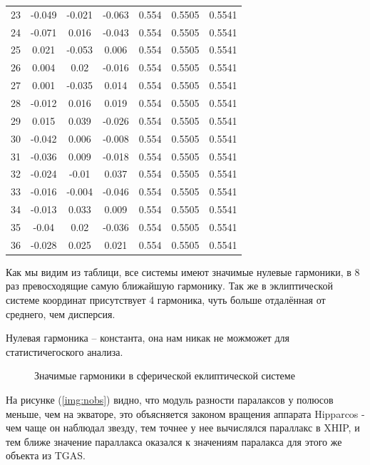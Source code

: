 \documentclass[14pt]{article} %
\begin{document}
\begin{table}[h!]
\begin{tabular}{c|c|c|c|c|c|c}
23 &-0.049 &-0.021 &-0.063 &0.554 &0.5505 &0.5541\\
24 &-0.071 &0.016 &-0.043 &0.554 &0.5505 &0.5541\\
25 &0.021 &-0.053 &0.006 &0.554 &0.5505 &0.5541\\
26 &0.004 &0.02 &-0.016 &0.554 &0.5505 &0.5541\\
27 &0.001 &-0.035 &0.014 &0.554 &0.5505 &0.5541\\
28 &-0.012 &0.016 &0.019 &0.554 &0.5505 &0.5541\\
29 &0.015 &0.039 &-0.026 &0.554 &0.5505 &0.5541\\
30 &-0.042 &0.006 &-0.008 &0.554 &0.5505 &0.5541\\
31 &-0.036 &0.009 &-0.018 &0.554 &0.5505 &0.5541\\
32 &-0.024 &-0.01 &0.037 &0.554 &0.5505 &0.5541\\
33 &-0.016 &-0.004 &-0.046 &0.554 &0.5505 &0.5541\\
34 &-0.013 &0.033 &0.009 &0.554 &0.5505 &0.5541\\
35 &-0.04 &0.02 &-0.036 &0.554 &0.5505 &0.5541\\
36 &-0.028 &0.025 &0.021 &0.554 &0.5505 &0.5541\\
\end{tabular}
\end{table}

Как мы видим из таблици, все системы имеют значимые нулевые гармоники, в 8 раз превосходящие самую ближайшую гармонику. Так же в эклиптической системе координат присутствует 4 гармоника, чуть больше отдалённая от среднего, чем дисперсия. 

Нулевая гармоника -- константа, она нам никак не можможет  для статистичегоского анализа. 

\begin{figure}[h!]
\caption{Значимые гармоники в сферической еклиптической системе}
\label{img:sfff}
\end{figure}

На рисунке (\ref{img:nobs}) видно, что модуль разности паралаксов  у полюсов меньше, чем на экваторе, это объясняется законом вращения аппарата Hipparcos - чем чаще он наблюдал звезду,
тем точнее у нее вычислялся параллакс в XHIP, и тем ближе значение параллакса оказался к значениям паралакса для этого же объекта из TGAS.
\end{document}
